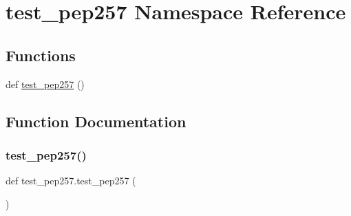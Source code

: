 \hypertarget{namespacetest__pep257}{}\section{test\+\_\+pep257 Namespace Reference}
\label{namespacetest__pep257}
\subsection*{Functions}
\begin{DoxyCompactItemize}
\item 
def \mbox{\hyperlink{namespacetest__pep257_ab3bd2c3967386ec5043276860b678e09}{test\+\_\+pep257}} ()
\end{DoxyCompactItemize}


\subsection{Function Documentation}
\mbox{\label{namespacetest__pep257_ab3bd2c3967386ec5043276860b678e09}} 
\subsubsection{\texorpdfstring{test\+\_\+pep257()}{test\_pep257()}}
{\footnotesize\ttfamily def test\+\_\+pep257.\+test\+\_\+pep257 (\begin{DoxyParamCaption}{ }\end{DoxyParamCaption})}

